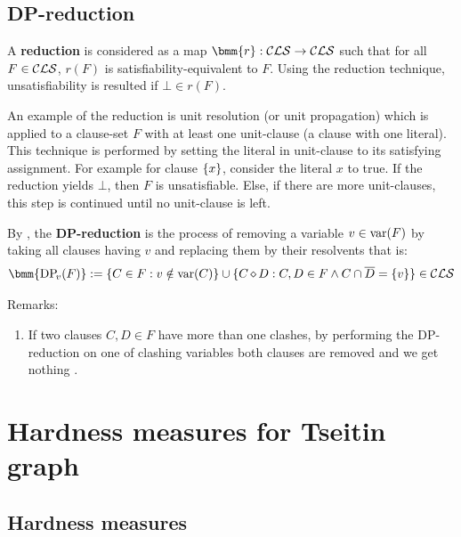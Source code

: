 \documentclass{report}
\begin{document}
\section{DP-reduction}
\label{sec:dpr}

\begin{defi}\label{def:redctn}
A \textbf{reduction} is considered as a map $\bmm{r}: \Cls \ra \Cls$ such that for all $F \in \mathcal{CLS}$, $r(F)$ is satisfiability-equivalent to $F$. Using the reduction technique, unsatisfiability is resulted if $\bot \in r(F)$.
\end{defi}

An example of the reduction is unit resolution (or unit propagation) which is applied to a clause-set $F$ with at least one unit-clause (a clause with one literal). This technique is performed by setting the literal in unit-clause to its satisfying assignment. For example for clause $\{ x \}$, consider the literal $x$ to true. If the reduction yields $\bot$, then $F$ is unsatisfiable. Else, if there are more unit-clauses, this step is continued until no unit-clause is left.

\begin{defi}\label{def:dpredc}
By \cite{KullmannZhao2010Extremal}, the \textbf{DP-reduction} is the process of removing a variable $v \in \operatorname{var}(F)$ by taking all clauses having $v$ and replacing them by their resolvents that is:
\begin{displaymath}
\bmm{\dpi{v}(F)} := \set{C \in F : v \notin \var(C)} \cup \set{C \res D : C, D \in F \und C \cap \ol{D} = \set{v}} \in \Cls
\end{displaymath}
\end{defi}
Remarks:
  \begin{enumerate}
  \item If two clauses $C,D \in F$ have more than one clashes, by performing the DP-reduction on one of clashing variables both clauses are removed and we get nothing .
   \end{enumerate}
\chapter{Hardness measures for Tseitin graph}
\label{cha:Hd-TseitinG}

\section{Hardness measures}
\label{sec:Hardnessmeasures}
\end{document}
